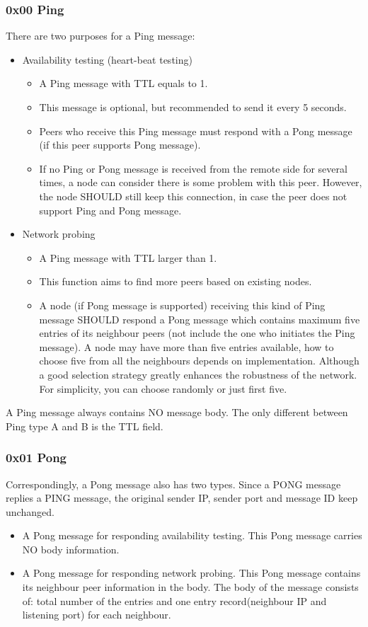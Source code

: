 \documentclass[12pt, a4paper]{article}
\begin{document}
\subsubsection{0x00 Ping}
There are two purposes for a Ping message:
\begin{itemize}
\item Availability testing (heart-beat testing)
\begin{itemize}
\item A Ping message with TTL equals to 1.
\item This message is optional, but recommended to send it every 5 seconds.
\item Peers who receive this Ping message must respond with a Pong message (if this peer supports Pong message).
\item If no Ping or Pong message is received from the remote side for several times, a node can consider there is some problem with this peer.
However, the node SHOULD still keep this connection, in case the peer does not support Ping and Pong message.
\end{itemize}
\item Network probing
\begin{itemize}
\item A Ping message with TTL larger than 1.
\item This function aims to find more peers based on existing nodes.
\item A node (if Pong message is supported) receiving this kind of Ping message SHOULD respond a Pong message which contains maximum five entries of its neighbour peers (not include the one who initiates the Ping message).
A node may have more than five entries available, how to choose five from all the neighbours depends on implementation.
Although a good selection strategy greatly enhances the robustness of the network.
For simplicity, you can choose randomly or just first five.
\end{itemize}
\end{itemize}

A Ping message always contains NO message body.
The only different between Ping type A and B is the TTL field.

\subsubsection{0x01 Pong}
Correspondingly, a Pong message also has two types.
Since a PONG message replies a PING message, the original sender IP, sender port and message ID keep unchanged.
\begin{itemize}
\item A Pong message for responding availability testing.
This Pong message carries NO body information.
\item A Pong message for responding network probing.
This Pong message contains its neighbour peer information in the body.
The body of the message consists of: total number of the entries and one entry record(neighbour IP and listening port) for each neighbour.
\end{itemize}
\end{document}

